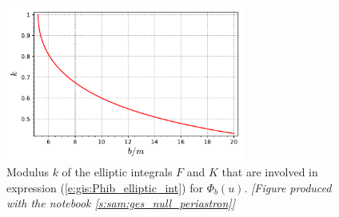\begin{figure}
\centerline{\includegraphics[width=0.7\textwidth]{gis_elliptic_mod.pdf}}
\caption[]{\label{f:gis:elliptic_mod} \footnotesize
Modulus $k$ of the elliptic integrals $F$ and $K$ that are involved
in expression (\ref{e:gis:Phib_elliptic_int}) for $\Phi_b(u)$.
\textsl{[Figure produced with the notebook \ref{s:sam:ges_null_periastron}]}
}
\end{figure}

